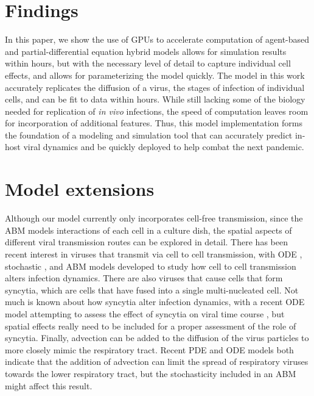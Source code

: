 \section{Findings}

In this paper, we show the use of GPUs to accelerate computation of agent-based and partial-differential equation hybrid models allows for simulation results within hours, but with the necessary level of detail to capture individual cell effects, and allows for parameterizing the model quickly. The model in this work accurately replicates the diffusion of a virus, the stages of infection of individual cells, and can be fit to data within hours. While still lacking some of the biology needed for replication of \emph{in vivo} infections, the speed of computation leaves room for incorporation of additional features. Thus, this model implementation forms the foundation of a modeling and simulation tool that can accurately predict in-host viral dynamics and be quickly deployed to help combat the next pandemic.

\section{Model extensions}

Although our model currently only incorporates cell-free transmission, since the ABM models interactions of each cell in a culture dish, the spatial aspects of different viral transmission routes can be explored in detail. There has been recent interest in viruses that transmit via cell to cell transmission, with ODE \citep{allen15,komarova13,iwami15}, stochastic \citep{graw15}, and ABM \citep{kumberger18,blahut21} models developed to study how cell to cell transmission alters infection dynamics. There are also viruses that cause cells that form syncytia, which are cells that have fused into a single multi-nucleated cell. Not much is known about how syncytia alter infection dynamics, with a recent ODE model attempting to assess the effect of syncytia on viral time course \citep{jessie21}, but spatial effects really need to be included for a proper assessment of the role of syncytia. Finally, advection can be added to the diffusion of the virus particles to more closely mimic the respiratory tract. Recent PDE \citep{quirouette20} and ODE \citep{gonzalez19} models both indicate that the addition of advection can limit the spread of respiratory viruses towards the lower respiratory tract, but the stochasticity included in an ABM might affect this result. 

